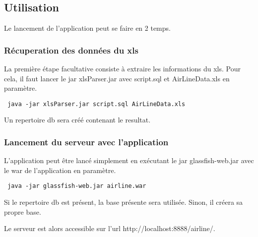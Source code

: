 \subsection{Utilisation}
Le lancement de l'application peut se faire en 2 temps.
\subsubsection{Récuperation des données du xls}
La première étape facultative consiste à extraire les informations du xls. Pour cela, il faut lancer le jar xlsParser.jar avec script.sql et AirLineData.xls en paramètre. 
\begin{verbatim}
 java -jar xlsParser.jar script.sql AirLineData.xls
\end{verbatim}
Un repertoire db sera créé contenant le resultat.
\subsubsection{Lancement du serveur avec l'application}
L'application peut être lancé simplement en exécutant le jar glassfish-web.jar avec le war de l'application en paramètre. 
\begin{verbatim}
 java -jar glassfish-web.jar airline.war
\end{verbatim}
Si le repertoire db est présent, la base présente sera utilisée. Sinon, il créera sa propre base.

Le serveur est alors accessible sur l'url http://localhost:8888/airline/.